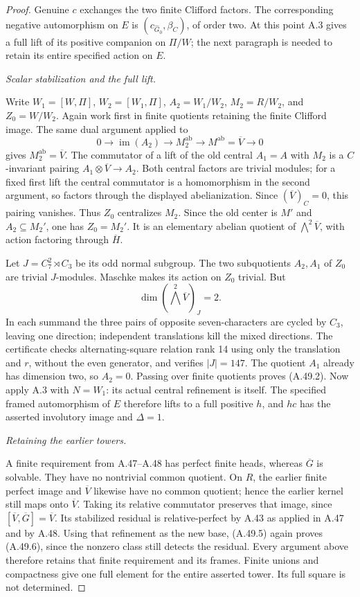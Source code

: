\begin{proof}
Genuine \(c\) exchanges the two finite
Clifford factors. The corresponding negative
automorphism on \(E\) is
\((c_{\widehat G_0},\beta_C)\), of order two.
At this point A.3 gives a full lift of its
positive companion on \(\Pi/W\); the next
paragraph is needed to retain its entire
specified action on \(E\).

\emph{Scalar stabilization and the full lift.}\par
Write \(W_1=[W,\Pi]\), \(W_2=[W_1,\Pi]\),
\(A_2=W_1/W_2\), \(M_2=R/W_2\), and
\(Z_0=W/W_2\). Again work first in finite
quotients retaining the finite Clifford image.
The same dual argument applied to
\[
 0\longrightarrow\operatorname{im}(A_2)
   \longrightarrow M_2^{\mathrm{ab}}
   \longrightarrow M^{\mathrm{ab}}=\overline V
   \longrightarrow0
\]
gives \(M_2^{\mathrm{ab}}=\overline V\).
The commutator of a lift of the old central
\(A_1=A\) with \(M_2\) is a \(C\)-invariant
pairing \(A_1\otimes\overline V\to A_2\).
Both central factors are trivial modules;
for a fixed first lift the central commutator
is a homomorphism in the second argument,
so factors through the displayed abelianization.
Since \((\overline V)_C=0\), this pairing
vanishes. Thus \(Z_0\) centralizes \(M_2\).
Since the old center is \(M'\) and
\(A_2\subseteq M_2'\), one has \(Z_0=M_2'\).
It is an elementary abelian quotient of
\(\bigwedge^2\overline V\), with action
factoring through \(\overline H\).

Let \(J=C_7^2\rtimes C_3\) be its odd
normal subgroup. The two subquotients
\(A_2,A_1\) of \(Z_0\) are trivial
\(J\)-modules. Maschke makes its action
on \(Z_0\) trivial. But
\[
                    \dim(\bigwedge^2\overline V)_J=2.
\]
In each summand the three pairs of opposite
seven-characters are cycled by \(C_3\),
leaving one direction; independent translations
kill the mixed directions. The certificate
checks alternating-square relation rank 14
using only the translation and \(r\),
without the even generator, and verifies
\(|J|=147\). The quotient \(A_1\) already
has dimension two, so \(A_2=0\).
Passing over finite quotients proves (A.49.2).
Now apply A.3 with \(N=W_1\): its actual
central refinement is itself. The specified
framed automorphism of \(E\) therefore lifts
to a full positive \(h\), and \(hc\) has
the asserted involutory image and \(\Delta=1\).

\emph{Retaining the earlier towers.}\par
A finite requirement from A.47--A.48 has
perfect finite heads, whereas \(\overline G\)
is solvable. They have no nontrivial common
quotient. On \(R\), the earlier finite
perfect image and \(\overline V\) likewise
have no common quotient; hence the earlier
kernel still maps onto \(\overline V\).
Taking its relative commutator preserves
that image, since
\([\overline V,\overline G]=\overline V\).
Its stabilized residual is relative-perfect
by A.43 as applied in A.47 and by A.48.
Using that refinement as the new base,
(A.49.5) again proves (A.49.6), since the
nonzero class still detects the residual.
Every argument above therefore retains
that finite requirement and its frames.
Finite unions and compactness give one
full element for the entire asserted tower.
Its full square is not determined.
\end{proof}
